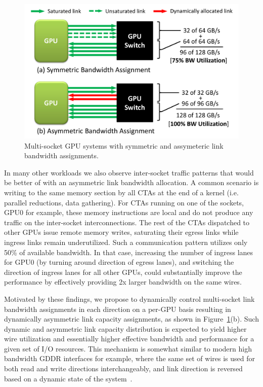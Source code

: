 \begin{figure}[t]
    \centering
    \includegraphics[width=1.0\columnwidth]{figures/link_assignment.pdf}
    \caption{Multi-socket GPU systems with symmetric and assymeteric link
    bandwidth assignments.}
    \label{fig:symmetric_assymetric}
    \vspace{-.2in}
\end{figure}

In many other workloads we also observe inter-socket traffic patterns that
would be better of with an asymmetric link bandwidth allocation. A common
scenario is writing to the same memory section by all CTAs at the end of a
kernel (i.e. parallel reductions, data gathering). For CTAs running on one of the
sockets, GPU0 for example, these memory instructions are local and do not
produce any traffic on the inter-socket interconnections. The rest of the CTAs dispatched
to other GPUs issue remote memory writes, saturating their egress links while
ingress links remain underutilized. Such a communication pattern utilizes only
50\% of available bandwidth. In that case, increasing the number of ingress lanes for GPU0
(by turning around direction of egress lanes), and switching the direction of
ingress lanes for all other GPUs, could substantially improve the performance
by effectively providing 2x larger bandwidth on the same wires. 

Motivated by these findings, we propose to dynamically control multi-socket
link bandwidth assignments in each direction on a per-GPU basis resulting in
dynamically asymmetric link capacity assignments, as shown in
Figure~\ref{fig:symmetric_assymetric}(b). Such dynamic and asymmetric link
capacity distribution is expected to yield higher wire utilization and
essentially higher effective bandwidth and performance for a given set of I/O
resources. This mechanism is somewhat similar to modern high bandwidth GDDR
interfaces for example,
where the same set of wires is used for both read and write directions
interchangeably, and link direction is reversed based on a dynamic state of the
system~\cite{hynixgddr51Gb}. 

